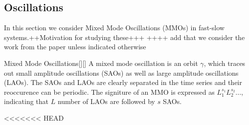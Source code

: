 \subsection{Oscillations}\label{sec: MMO Oscilaltions} %
In this section we consider Mixed Mode Oscillations (MMOs) in fast-slow systems.++Motivation for studying these+++
++++ add that we consider the work from the \citet{MMO} paper unless indicated otherwise

\begin{definition}{Mixed Mode Oscillations}[\citealp{kuehn}][\citealp{MMO}]
	A mixed mode oscillation is an orbit $\gamma$, which traces out small amplitude oscillations (SAOs) as well as large amplitude oscillations (LAOs).
	The SAOs and LAOs are clearly separated in the time series and their reoccurence can be periodic.
	The signiture of an MMO is expressed as $L_1^{s_1}L_2^{s_2}...$, indicating that $L$ number of LAOs are followed by $s$ SAOs.
\end{definition}

<<<<<<< HEAD
